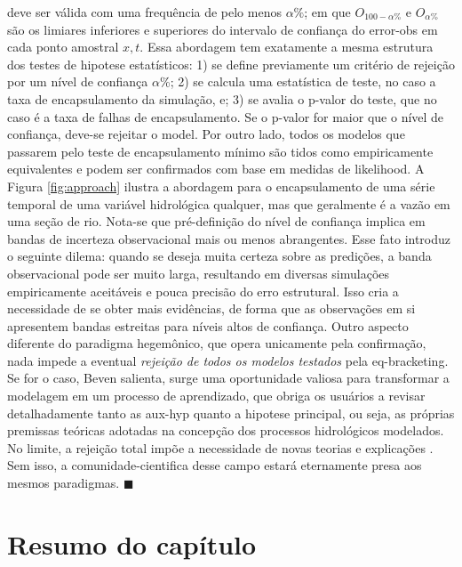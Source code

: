 \documentclass[./main.tex]{subfiles}
\begin{document}
deve ser válida com uma frequência de pelo menos $\alpha\%$; em que $O_{100-\alpha\%}$ e  $O_{\alpha\%}$ são os limiares inferiores e superiores do intervalo de confiança do \gls{error-obs} em cada ponto amostral $x, t$. Essa abordagem tem exatamente a mesma estrutura dos testes de \gls{hipotese} estatísticos: 1) se define previamente um critério de rejeição por um nível de confiança $\alpha$\%; 2) se calcula uma estatística de teste, no caso a taxa de encapsulamento da simulação, e; 3) se avalia o p-valor do teste, que no caso é a taxa de falhas de encapsulamento. Se o p-valor for maior que o nível de confiança, deve-se rejeitar o \gls{model}. Por outro lado, todos os modelos que passarem pelo teste de encapsulamento mínimo são tidos como empiricamente equivalentes e podem ser confirmados com base em medidas de \gls{likelihood}. A Figura \ref{fig:approach} ilustra a abordagem para o encapsulamento de uma série temporal de uma variável hidrológica qualquer, mas que geralmente é a vazão em uma seção de rio. Nota-se que pré-definição do nível de confiança implica em bandas de incerteza observacional mais ou menos abrangentes. Esse fato introduz o seguinte dilema: quando se deseja muita certeza sobre as predições, a banda observacional pode ser muito larga, resultando em diversas simulações empiricamente aceitáveis e pouca precisão do erro estrutural. Isso cria a necessidade de se obter mais evidências, de forma que as observações em si apresentem bandas estreitas para níveis altos de confiança. Outro aspecto diferente do \gls{paradigma} hegemônico, que opera unicamente pela confirmação, nada impede a eventual \textit{rejeição de todos os modelos testados} pela \gls{eq-bracketing}. Se for o caso, Beven salienta, surge uma oportunidade valiosa para transformar a modelagem em um processo de aprendizado, que obriga os usuários a revisar detalhadamente tanto as \gls{aux-hyp} quanto a \gls{hipotese} principal, ou seja, as próprias premissas teóricas adotadas na concepção dos processos hidrológicos modelados. No limite, a rejeição total impõe a necessidade de novas teorias e explicações \cite{Beven2018}. Sem isso, a \gls{comunidade-cientifica} desse campo estará eternamente presa aos mesmos paradigmas. $\blacksquare$

\clearpage

\section{Resumo do capítulo} \label{sec:epis:summary}
\end{document}
